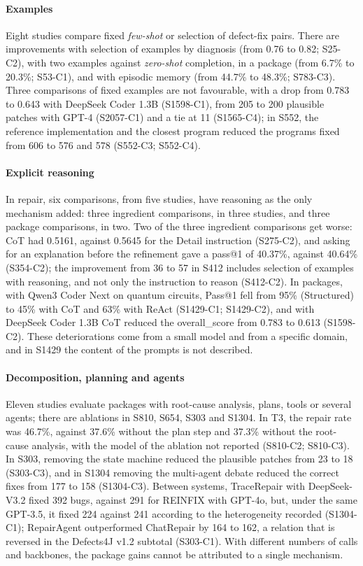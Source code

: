 \paragraph{Examples}
Eight studies compare fixed \textit{few-shot} or selection of defect-fix pairs.
There are improvements with selection of examples by diagnosis (from 0.76 to 0.82; S25-C2), with two examples against \textit{zero-shot} completion, in a package (from 6.7\% to 20.3\%; S53-C1), and with episodic memory (from 44.7\% to 48.3\%; S783-C3).
Three comparisons of fixed examples are not favourable, with a drop from 0.783 to 0.643 with DeepSeek Coder 1.3B (S1598-C1), from 205 to 200 plausible patches with GPT-4 (S2057-C1) and a tie at 11 (S1565-C4); in S552, the reference implementation and the closest program reduced the programs fixed from 606 to 576 and 578 (S552-C3; S552-C4).

\paragraph{Explicit reasoning}
In repair, six comparisons, from five studies, have reasoning as the only mechanism added: three ingredient
comparisons, in three studies, and three package comparisons, in two.
Two of the three ingredient comparisons get worse: CoT had 0.5161, against 0.5645 for the Detail instruction (S275-C2), and asking for an explanation before the refinement gave a pass@1 of 40.37\%, against 40.64\% (S354-C2); the improvement from 36 to 57 in S412 includes selection of examples with reasoning, and not only the instruction to reason (S412-C2).
In packages, with Qwen3 Coder Next on quantum circuits, Pass@1 fell from 95\% (Structured) to 45\% with CoT and 63\% with ReAct (S1429-C1; S1429-C2), and with DeepSeek Coder 1.3B CoT reduced the overall\_score from 0.783 to 0.613 (S1598-C2).
These deteriorations come from a small model and from a specific domain, and in S1429 the content of the prompts is not described.

\paragraph{Decomposition, planning and agents}
Eleven studies evaluate packages with root-cause analysis, plans, tools or several agents; there are ablations in S810, S654, S303 and S1304.
In T3, the repair rate was 46.7\%, against 37.6\% without the plan step and 37.3\% without the root-cause analysis, with the model of the ablation not reported (S810-C2; S810-C3).
In S303, removing the state machine reduced the plausible patches from 23 to 18 (S303-C3), and in S1304 removing the multi-agent debate reduced the correct fixes from 177 to 158 (S1304-C3).
Between systems, TraceRepair with DeepSeek-V3.2 fixed 392 bugs, against 291 for REINFIX with GPT-4o, but, under the same GPT-3.5, it fixed 224 against 241 according to the heterogeneity recorded (S1304-C1); RepairAgent outperformed ChatRepair by 164 to 162, a relation that is reversed in the Defects4J v1.2 subtotal (S303-C1).
With different numbers of calls and backbones, the package gains cannot be attributed to a single mechanism.

